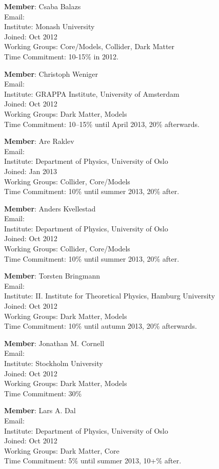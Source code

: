 \textbf{Member}: Csaba Balazs\\
Email: \\
Institute: Monash University\\
Joined: Oct 2012\\
Working Groups: Core/Models, Collider, Dark Matter\\
Time Commitment: 10-15\% in 2012. 

\textbf{Member}: Christoph Weniger\\
Email: \\
Institute: GRAPPA Institute, University of Amsterdam\\
Joined: Oct 2012\\
Working Groups: Dark Matter, Models\\
Time Commitment: 10--15\% until April 2013, 20\% afterwards.

\textbf{Member}: Are Raklev\\
Email: \\
Institute: Department of Physics, University of Oslo\\
Joined: Jan 2013\\
Working Groups: Collider, Core/Models\\
Time Commitment: 10\% until summer 2013, 20\% after.

\textbf{Member}: Anders Kvellestad\\
Email: \\
Institute: Department of Physics, University of Oslo\\
Joined: Oct 2012\\
Working Groups: Collider, Core/Models\\
Time Commitment: 10\% until summer 2013, 20\% after.

\textbf{Member}: Torsten Bringmann\\
Email: \\
Institute: II. Institute for Theoretical Physics, Hamburg University\\
Joined: Oct 2012\\
Working Groups: Dark Matter, Models\\
Time Commitment: 10\% until autumn 2013, 20\% afterwards.

\textbf{Member}: Jonathan M. Cornell\\
Email: \\
Institute: Stockholm University\\
Joined: Oct 2012\\
Working Groups: Dark Matter, Models\\
Time Commitment: 30\%

\textbf{Member}: Lars A. Dal\\
Email: \\
Institute: Department of Physics, University of Oslo\\
Joined: Oct 2012\\
Working Groups: Dark Matter, Core\\
Time Commitment: 5\% until summer 2013, 10+\% after.


